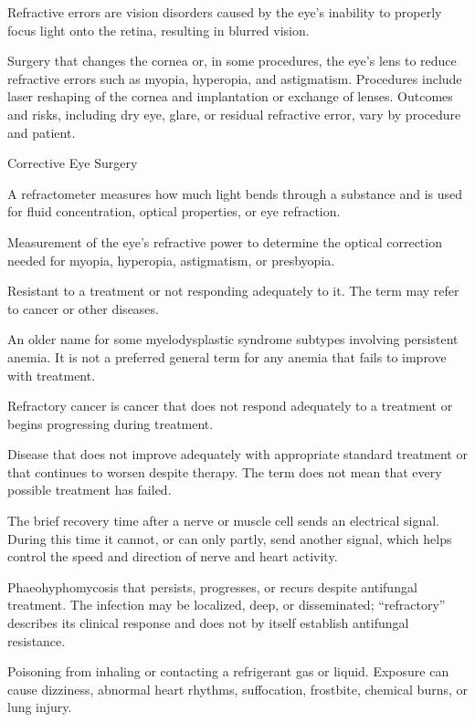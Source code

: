  Refractive errors are vision disorders caused by the eye's inability to properly focus
light onto the retina, resulting in blurred vision.

 Surgery that changes the cornea or, in some procedures, the eye's lens to
reduce refractive errors such as myopia, hyperopia, and astigmatism. Procedures include
laser reshaping of the cornea and implantation or exchange of lenses. Outcomes and risks,
including dry eye, glare, or residual refractive error, vary by procedure and patient.

\synonyms
Corrective Eye Surgery

 A refractometer measures how much light bends through a substance and is used for fluid concentration, optical properties, or eye refraction.

 Measurement of the eye’s refractive power to determine the optical correction needed for myopia, hyperopia, astigmatism, or presbyopia.

 Resistant to a treatment or not responding adequately to it. The term may refer to cancer or other diseases.

 An older name for some myelodysplastic syndrome subtypes involving persistent anemia. It is not a preferred general term for any anemia that fails to improve with treatment.

 Refractory cancer is cancer that does not respond adequately to a treatment or begins progressing during treatment.

 Disease that does not improve adequately with appropriate standard treatment or that continues to worsen despite therapy. The term does not mean that every possible treatment has failed.

 The brief recovery time after a nerve or muscle cell sends an electrical signal. During this time it cannot, or can only partly, send another signal, which helps control the speed and direction of nerve and heart activity.

 Phaeohyphomycosis that persists, progresses, or recurs despite antifungal treatment. The infection may be localized, deep, or disseminated; ``refractory'' describes its clinical response and does not by itself establish antifungal resistance.

 Poisoning from inhaling or contacting a refrigerant gas or liquid. Exposure can cause dizziness, abnormal heart rhythms, suffocation, frostbite, chemical burns, or lung injury.

